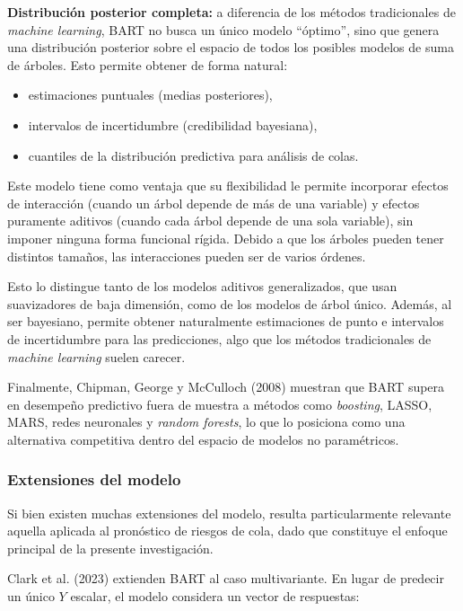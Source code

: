 ﻿\documentclass[11pt,a4paper]{article}
\begin{document}
\vspace{0.2cm}

\textbf{Distribución posterior completa:} a diferencia de los métodos tradicionales de \textit{machine learning}, BART no busca un único modelo “óptimo”, sino que genera una distribución posterior sobre el espacio de todos los posibles modelos de suma de árboles. Esto permite obtener de forma natural:

\begin{itemize}
    \item estimaciones puntuales (medias posteriores),
    \item intervalos de incertidumbre (credibilidad bayesiana),
    \item cuantiles de la distribución predictiva para análisis de colas.
\end{itemize}

Este modelo tiene como ventaja que su flexibilidad le permite incorporar efectos de interacción (cuando un árbol depende de más de una variable) y efectos puramente aditivos (cuando cada árbol depende de una sola variable), sin imponer ninguna forma funcional rígida. Debido a que los árboles pueden tener distintos tamaños, las interacciones pueden ser de varios órdenes. 

Esto lo distingue tanto de los modelos aditivos generalizados, que usan suavizadores de baja dimensión, como de los modelos de árbol único. Además, al ser bayesiano, permite obtener naturalmente estimaciones de punto e intervalos de incertidumbre para las predicciones, algo que los métodos tradicionales de \textit{machine learning} suelen carecer.

Finalmente, Chipman, George y McCulloch (2008) muestran que BART supera en desempeño predictivo fuera de muestra a métodos como \textit{boosting}, LASSO, MARS, redes neuronales y \textit{random forests}, lo que lo posiciona como una alternativa competitiva dentro del espacio de modelos no paramétricos.

\subsubsection{Extensiones del modelo}

Si bien existen muchas extensiones del modelo, resulta particularmente relevante aquella aplicada al pronóstico de riesgos de cola, dado que constituye el enfoque principal de la presente investigación.

Clark et al. (2023) extienden BART al caso multivariante. En lugar de predecir un único $Y$ escalar, el modelo considera un vector de respuestas:
\end{document}
